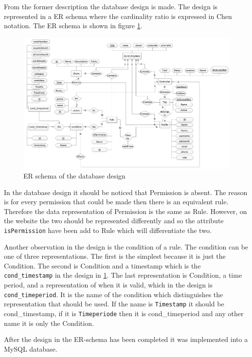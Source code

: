 From the former description the database design is made. The design is represented in a ER schema where the cardinality ratio is expressed in 
Chen notation\citep{DatabaseKilde}. The ER schema is shown in figure \ref{fig:ERdiagram}. 

\begin{figure}
	\centering
		\includegraphics[width=1.00\textwidth]{images/ERdiagram.jpg}
	\caption{ER schema of the database design}
	\label{fig:ERdiagram}
\end{figure}

In the database design it should be noticed that Permission is absent. The reason is for every permission that could be made then there is an equivalent rule. Therefore the data representation of Permission is the same as Rule. However, on the website the two should be represented differently and so the attribute \texttt{isPermission} have been add to Rule which will differentiate the two.

Another observation in the design is the condition of a rule. The condition can be one of three representations. The first is the simplest because it is just the Condition. The second is Condition and a timestamp which is the \texttt{cond\_timestamp} in the design in \ref{fig:ERdiagram}. The last representation is Condition, a time period, and a representation of when it is valid, which in the design is \texttt{cond\_timeperiod}. 
 It is the name of the condition which distinguishes the representation that should be used. If the name is \texttt{Timestamp} it should be cond\_timestamp, if it is \texttt{Timeperiode} then it is cond\_timeperiod and any other name it is only the Condition. 

After the design in the ER-schema has been completed it was implemented into a MySQL database.  

